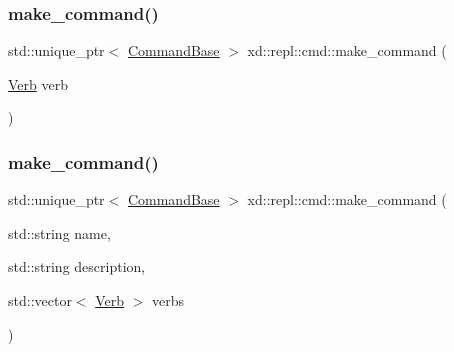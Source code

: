 \mbox{\label{namespacexd_1_1repl_1_1cmd_a5b8451665b6551b691cea4e66fb5eb84}} 
\subsubsection{\texorpdfstring{make\+\_\+command()}{make\_command()}\hspace{0.1cm}{\footnotesize\ttfamily [1/2]}}
{\footnotesize\ttfamily std\+::unique\+\_\+ptr$<$ \mbox{\hyperlink{classxd_1_1repl_1_1cmd_1_1_command_base}{Command\+Base}} $>$ xd\+::repl\+::cmd\+::make\+\_\+command (\begin{DoxyParamCaption}\item[{\mbox{\hyperlink{classxd_1_1repl_1_1cmd_1_1_verb}{Verb}}}]{verb }\end{DoxyParamCaption})}

\mbox{\label{namespacexd_1_1repl_1_1cmd_adfa9dfe4494b4e94f13d93c728ed58b6}} 
\subsubsection{\texorpdfstring{make\+\_\+command()}{make\_command()}\hspace{0.1cm}{\footnotesize\ttfamily [2/2]}}
{\footnotesize\ttfamily std\+::unique\+\_\+ptr$<$ \mbox{\hyperlink{classxd_1_1repl_1_1cmd_1_1_command_base}{Command\+Base}} $>$ xd\+::repl\+::cmd\+::make\+\_\+command (\begin{DoxyParamCaption}\item[{std\+::string}]{name,  }\item[{std\+::string}]{description,  }\item[{std\+::vector$<$ \mbox{\hyperlink{classxd_1_1repl_1_1cmd_1_1_verb}{Verb}} $>$}]{verbs }\end{DoxyParamCaption})}

\mbox{\label{namespacexd_1_1repl_1_1cmd_ae81695e15af5bcbabe68acd7894dc4a4}} 

